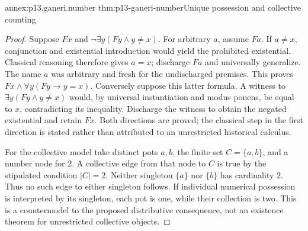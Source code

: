 \begin{annexitem}{annex:p13.ganeri.number}
 {thm:p13-ganeri-number}{Unique possession and collective counting}
\begin{proof}
Suppose \(Fx\) and \(\neg\exists y(Fy\land y\ne x)\).
For arbitrary \(a\), assume \(Fa\). If \(a\ne x\), conjunction and
existential introduction would yield the prohibited existential.
Classical reasoning therefore gives \(a=x\); discharge \(Fa\)
and universally generalize. The name \(a\) was arbitrary and fresh
for the undischarged premises. This proves
\(Fx\land\forall y(Fy\to y=x)\).
Conversely suppose this latter formula. A witness to
\(\exists y(Fy\land y\ne x)\) would, by universal instantiation
and modus ponens, be equal to \(x\), contradicting its inequality.
Discharge the witness to obtain the negated existential and retain \(Fx\).
Both directions are proved; the classical step in the first direction
is stated rather than attributed to an unrestricted historical calculus.

For the collective model take distinct pots \(a,b\), the finite set
\(C=\{a,b\}\), and a number node for 2. A collective edge from that
node to \(C\) is true by the stipulated condition \(|C|=2\).
Neither singleton \(\{a\}\) nor \(\{b\}\) has cardinality 2.
Thus no such edge to either singleton follows. If individual numerical
possession is interpreted by its singleton, each pot is one, while
their collection is two. This is a countermodel to the proposed
distributive consequence, not an existence theorem for unrestricted
collective objects.
\end{proof}
\end{annexitem}
